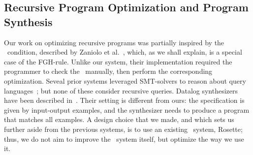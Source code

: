 
\subsection{Recursive Program Optimization and Program Synthesis}
\label{sec:related:recursion}

Our work on optimizing recursive programs was partially inspired by the \prem\
condition, described by Zaniolo et
al.~\cite{DBLP:journals/tplp/ZanioloYDSCI17}, which, as we shall
explain, is a special case of the FGH-rule.  Unlike our system, their
implementation required the programmer to check the \prem\ manually,
then perform the corresponding optimization.
%
Seveal prior systems  leveraged SMT-solvers to reason about
query languages~\cite{
  DBLP:conf/icfem/VeanesGHT09,
  DBLP:conf/cidr/ChuWWC17,
  DBLP:conf/cav/GrossmanCIRS17,
  DBLP:conf/sosp/SchlaipferRLS17,
  DBLP:journals/pacmpl/0001DLC18};
but none of these  consider recursive queries.
%
Datalog synthesizers have been described in~\cite{
  DBLP:conf/cp/AlbarghouthiKNS17,
  DBLP:conf/sigsoft/SiLZAKN18,
  DBLP:conf/ijcai/SiRHN19,
  DBLP:journals/pvldb/WangSCPD20,
  DBLP:journals/pacmpl/RaghothamanMZNS20}.
Their setting is different from ours:
the specification is given by input-output examples, and the
synthesizer needs to produce a program that matches all examples.
A design choice that we made, and which sets us further aside from the
previous systems, is to use an existing \cegis\ system, Rosette; thus,
we do not aim to  improve the \cegis\ system itself, but optimize the
way we use it.

